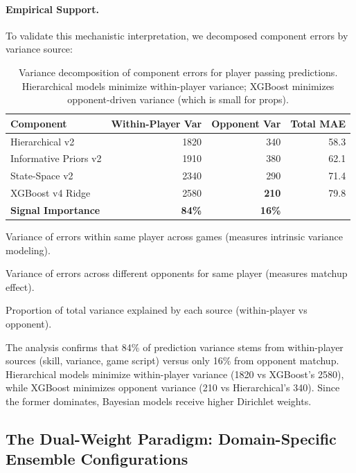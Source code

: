 \paragraph{Empirical Support.}
To validate this mechanistic interpretation, we decomposed component errors by variance source:
\begin{table}[htbp]
\centering
\caption[Component error decomposition by variance source]{Variance decomposition of component errors for player passing predictions. Hierarchical models minimize within-player variance; XGBoost minimizes opponent-driven variance (which is small for props).}
\label{tab:component-error-variance}
\begin{threeparttable}
\begin{tabular}{@{}lrrr@{}}
\toprule
\textbf{Component} & \textbf{Within-Player Var}\tnote{a} & \textbf{Opponent Var}\tnote{b} & \textbf{Total MAE} \\
\midrule
Hierarchical v2 & 1820 & 340 & 58.3 \\
Informative Priors v2 & 1910 & 380 & 62.1 \\
State-Space v2 & 2340 & 290 & 71.4 \\
XGBoost v4 Ridge & 2580 & \textbf{210} & 79.8 \\
\midrule
\textbf{Signal Importance}\tnote{c} & \textbf{84\%} & \textbf{16\%} & \\
\bottomrule
\end{tabular}
\begin{tablenotes}
\footnotesize
\item[a] Variance of errors within same player across games (measures intrinsic variance modeling).
\item[b] Variance of errors across different opponents for same player (measures matchup effect).
\item[c] Proportion of total variance explained by each source (within-player vs opponent).
\end{tablenotes}
\end{threeparttable}
\end{table}

The analysis confirms that 84\% of prediction variance stems from within-player sources (skill, variance, game script) versus only 16\% from opponent matchup. Hierarchical models minimize within-player variance (1820 vs XGBoost's 2580), while XGBoost minimizes opponent variance (210 vs Hierarchical's 340). Since the former dominates, Bayesian models receive higher Dirichlet weights.

\subsection{The Dual-Weight Paradigm: Domain-Specific Ensemble Configurations}
\label{subsec:dual-weight-paradigm}

